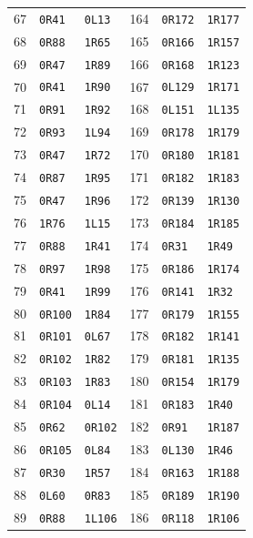 \begin{longtable}{@{}rll@{\hspace{24pt}}rll@{}}
67 & \texttt{0R41} & \texttt{0L13} & 164 & \texttt{0R172} & \texttt{1R177}\\
68 & \texttt{0R88} & \texttt{1R65} & 165 & \texttt{0R166} & \texttt{1R157}\\
69 & \texttt{0R47} & \texttt{1R89} & 166 & \texttt{0R168} & \texttt{1R123}\\
70 & \texttt{0R41} & \texttt{1R90} & 167 & \texttt{0L129} & \texttt{1R171}\\
71 & \texttt{0R91} & \texttt{1R92} & 168 & \texttt{0L151} & \texttt{1L135}\\
72 & \texttt{0R93} & \texttt{1L94} & 169 & \texttt{0R178} & \texttt{1R179}\\
73 & \texttt{0R47} & \texttt{1R72} & 170 & \texttt{0R180} & \texttt{1R181}\\
74 & \texttt{0R87} & \texttt{1R95} & 171 & \texttt{0R182} & \texttt{1R183}\\
75 & \texttt{0R47} & \texttt{1R96} & 172 & \texttt{0R139} & \texttt{1R130}\\
76 & \texttt{1R76} & \texttt{1L15} & 173 & \texttt{0R184} & \texttt{1R185}\\
77 & \texttt{0R88} & \texttt{1R41} & 174 & \texttt{0R31} & \texttt{1R49}\\
78 & \texttt{0R97} & \texttt{1R98} & 175 & \texttt{0R186} & \texttt{1R174}\\
79 & \texttt{0R41} & \texttt{1R99} & 176 & \texttt{0R141} & \texttt{1R32}\\
80 & \texttt{0R100} & \texttt{1R84} & 177 & \texttt{0R179} & \texttt{1R155}\\
81 & \texttt{0R101} & \texttt{0L67} & 178 & \texttt{0R182} & \texttt{1R141}\\
82 & \texttt{0R102} & \texttt{1R82} & 179 & \texttt{0R181} & \texttt{1R135}\\
83 & \texttt{0R103} & \texttt{1R83} & 180 & \texttt{0R154} & \texttt{1R179}\\
84 & \texttt{0R104} & \texttt{0L14} & 181 & \texttt{0R183} & \texttt{1R40}\\
85 & \texttt{0R62} & \texttt{0R102} & 182 & \texttt{0R91} & \texttt{1R187}\\
86 & \texttt{0R105} & \texttt{0L84} & 183 & \texttt{0L130} & \texttt{1R46}\\
87 & \texttt{0R30} & \texttt{1R57} & 184 & \texttt{0R163} & \texttt{1R188}\\
88 & \texttt{0L60} & \texttt{0R83} & 185 & \texttt{0R189} & \texttt{1R190}\\
89 & \texttt{0R88} & \texttt{1L106} & 186 & \texttt{0R118} & \texttt{1R106}\\

\end{longtable}
